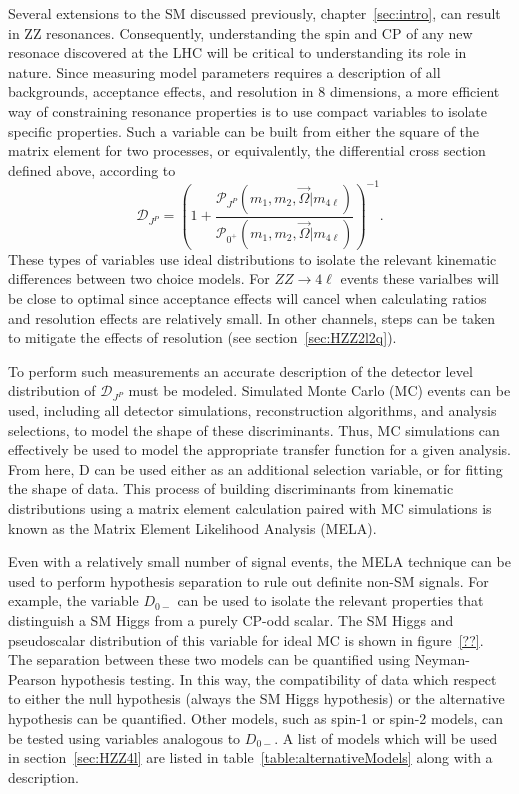 Several extensions
to the SM discussed previously, chapter~\ref{sec:intro}, can result 
in ZZ resonances.  
Consequently, understanding the spin and CP of any new resonace discovered 
at the LHC will be critical to understanding its role in nature.  
Since measuring model parameters requires a description of all backgrounds, 
acceptance effects, and resolution in 8 dimensions, a more efficient way of
constraining resonance properties is to use compact variables to isolate 
specific properties.  Such a variable can be 
built from either the square of the matrix element for two processes, or 
equivalently, the differential cross section defined above, according to 
\begin{equation}
\mathscr{D}_{J^P} = \left(1+\frac{\mathscr{P}_{J^{P}}(m_1,m_2,\vec{\Omega}|m_{4\ell})}{\mathscr{P}_{0^+}(m_1,m_2,\vec{\Omega}|m_{4\ell})}\right)^{-1}.
\label{eq:KD}
\end{equation}
These types of variables use ideal distributions to isolate 
the relevant kinematic differences between two choice models.
For $ZZ\to4\ell$ events these varialbes will be close to optimal
since acceptance effects 
will cancel when calculating ratios and resolution effects are
relatively small.  In other channels,
steps can be taken to mitigate the effects of resolution (see
section~\ref{sec:HZZ2l2q}).

To perform such measurements an accurate description of the detector 
level distribution of $\mathscr{D}_{J^P}$ must be modeled.  Simulated Monte Carlo (MC)
events can be used, including all detector simulations, reconstruction
algorithms, and analysis selections, to model the shape of these discriminants.
Thus, MC simulations can effectively be used to model the appropriate 
transfer function for a given analysis.  From here, D can be used either 
as an additional selection variable, or for fitting the shape of data. 
This process of building discriminants from kinematic distributions
using a matrix element calculation paired with MC simulations is known
as the Matrix Element Likelihood Analysis (MELA).

Even with a relatively small number of signal events, the MELA technique
can be used to perform hypothesis separation to rule out definite non-SM 
signals.  For example, the variable $D_{0-}$ can be used to isolate
the relevant properties that distinguish a SM Higgs from a purely CP-odd
scalar.  The SM Higgs and pseudoscalar distribution of this variable for 
ideal MC is shown in figure~\ref{??}.  The separation between these two 
models can be quantified using Neyman-Pearson hypothesis testing.  In this 
way, the compatibility of data which respect to either the null hypothesis
(always the SM Higgs hypothesis) or the alternative hypothesis can be 
quantified.  Other models, such as spin-1 or spin-2 models, can be tested 
using variables analogous to $D_{0-}$.  A list of models which will be 
used in section~\ref{sec:HZZ4l} are listed in table~\ref{table:alternativeModels} 
along with a description.

